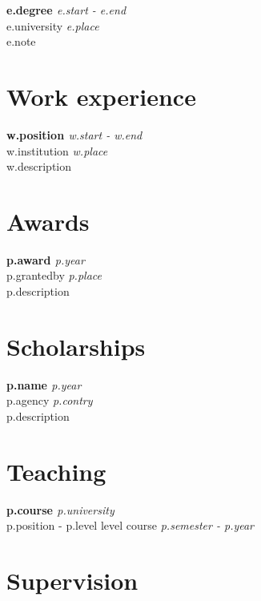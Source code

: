\documentclass[10pt,letterpaper]{article} %
\begin{document}
{%
    {\bf {{ e.degree }} } \hfill {\em  {{ e.start }} -   {{ e.end }}  } \\
    {{ e.university }}  \hfill {\em {{ e.place}} }\\
    {{ e.note }}
{%


\section*{Work experience} %

{%
    {\bf {{ w.position }} } \hfill {\em  {{ w.start }} -   {{ w.end }}  } \\
    {{ w.institution }} \hfill {\em  {{ w.place }}} \\
    {{ w.description }}
{%

\section*{Awards}

{%
{\bf {{ p.award }}} \hfill {\em {{ p.year }} }\\
{ {{ p.grantedby }} } \hfill  {\em {{p.place}} } \\
    {{ p.description }}
{%

\section*{Scholarships}

{%
{\bf {{ p.name }}} \hfill {\em {{ p.year }} } \\
{ {{ p.agency }} } \hfill  {\em {{p.contry}} } \\
    {{ p.description }}
{%

\section*{Teaching}

{%
    {\bf {{  p.course }}  } \hfill {\em {{ p.university }}} \\
    { {{ p.position }}  - {{ p.level }} level course } \hfill {\em {{ p.semester }} - {{ p.year }} }\\ {%

\section*{Supervision}

}}}}}}}}}}
\end{document}
